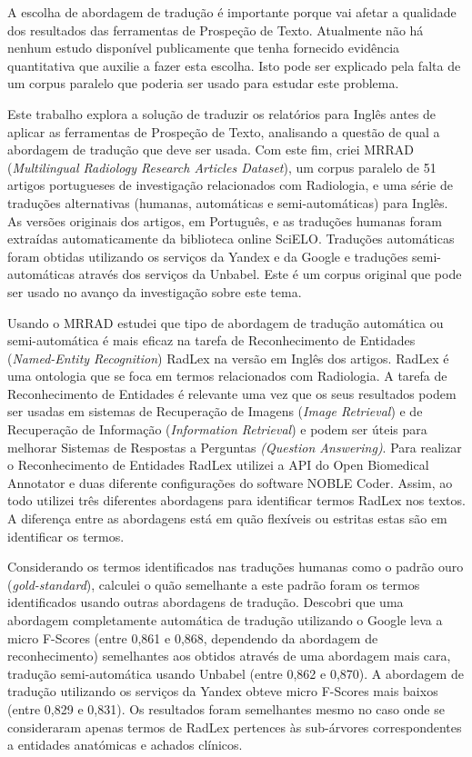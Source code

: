 \begin{abstractspt}
A escolha de abordagem de tradução é importante porque vai afetar a qualidade dos resultados das ferramentas de Prospeção de Texto. Atualmente não há nenhum estudo disponível publicamente que tenha fornecido evidência quantitativa que auxilie a fazer esta escolha. Isto pode ser explicado pela falta de um corpus paralelo que poderia ser usado para estudar este problema. 

Este trabalho explora a solução de traduzir os relatórios para Inglês antes de aplicar as ferramentas de Prospeção de Texto, analisando a questão de qual a abordagem de tradução que deve ser usada. Com este fim, criei MRRAD (\textit{Multilingual Radiology Research Articles Dataset}), um corpus paralelo de 51 artigos portugueses de investigação relacionados com Radiologia, e uma série de traduções alternativas (humanas, automáticas e semi-automáticas) para Inglês. As versões originais dos artigos, em Português, e as traduções humanas foram extraídas automaticamente da biblioteca online SciELO. Traduções automáticas foram obtidas utilizando os serviços da Yandex e da Google e traduções semi-automáticas através dos serviços da Unbabel. Este é um corpus original que pode ser usado no avanço da investigação sobre este tema.

Usando o MRRAD estudei que tipo de abordagem de tradução automática ou semi-automática é mais eficaz na tarefa de Reconhecimento de Entidades (\textit{Named-Entity Recognition}) RadLex na versão em Inglês dos artigos. RadLex é uma ontologia que se foca em termos relacionados com Radiologia. A tarefa de Reconhecimento de Entidades é relevante uma vez que os seus resultados podem ser usadas em sistemas de Recuperação de Imagens (\textit{Image Retrieval}) e de Recuperação de Informação (\textit{Information Retrieval}) e podem ser úteis para melhorar Sistemas de Respostas a Perguntas \textit{(Question Answering)}. Para realizar o Reconhecimento de Entidades RadLex utilizei a API do Open Biomedical Annotator e duas diferente configurações do software NOBLE Coder. Assim, ao todo utilizei três diferentes abordagens para identificar termos RadLex nos textos. A diferença entre as abordagens está em quão flexíveis ou estritas estas são em identificar os termos. 

Considerando os termos identificados nas traduções humanas como o padrão ouro (\textit{gold-standard}), calculei o quão semelhante a este padrão foram os termos identificados usando outras abordagens de tradução. Descobri que uma abordagem completamente automática de tradução utilizando o Google leva a micro F-Scores (entre 0,861 e 0,868, dependendo da abordagem de reconhecimento) semelhantes aos obtidos através de uma abordagem mais cara, tradução semi-automática usando Unbabel (entre 0,862 e 0,870). A abordagem de tradução utilizando os serviços da Yandex obteve micro F-Scores mais baixos (entre 0,829 e 0,831). Os resultados foram semelhantes mesmo no caso onde se consideraram apenas termos de RadLex pertences às sub-árvores correspondentes a entidades anatómicas e achados clínicos. 


\end{abstractspt}

